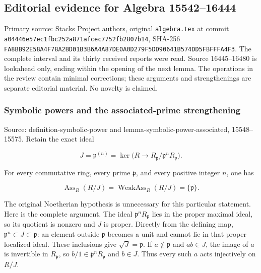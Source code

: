 \subsection{Editorial evidence for Algebra 15542--16444}\label{algebra-proof-005-editorial-evidence-for-algebra-1554216444}

Primary source: Stacks Project authors, original \texttt{algebra.tex} at commit \texttt{a044\allowbreak{}46e5\allowbreak{}7ec1\allowbreak{}fbc2\allowbreak{}52a8\allowbreak{}71af\allowbreak{}cec7\allowbreak{}752f\allowbreak{}b280\allowbreak{}7b14}, SHA-256 \texttt{FA8B\allowbreak{}B92E\allowbreak{}58A4\allowbreak{}F78A\allowbreak{}2BD0\allowbreak{}1B3B\allowbreak{}6A4A\allowbreak{}87DE\allowbreak{}0A0D\allowbreak{}279F\allowbreak{}5DD9\allowbreak{}0641\allowbreak{}B574\allowbreak{}DD5F\allowbreak{}BFFF\allowbreak{}A4F3}. The complete interval and its thirty received reports were read. Source 16445--16480 is lookahead only, ending within the opening of the next lemma. The operations in the review contain minimal corrections; these arguments and strengthenings are separate editorial material. No novelty is claimed.

\subsubsection{Symbolic powers and the associated-prime strengthening}\label{algebra-proof-005-symbolic-powers-and-the-associated-prime-strengthening}

Source: definition-symbolic-power and lemma-symbolic-power-associated, 15548--15575. Retain the exact ideal

\[
J=\mathfrak p^{(n)}=\ker\bigl(R\longrightarrow R_{\mathfrak p}/\mathfrak p^nR_{\mathfrak p}\bigr).
\]

For every commutative ring, every prime \(\mathfrak p\), and every positive integer \(n\), one has

\[
\operatorname{Ass}_R(R/J)=\operatorname{WeakAss}_R(R/J)=\{\mathfrak p\}.
\]

The original Noetherian hypothesis is unnecessary for this particular statement. Here is the complete argument. The ideal \(\mathfrak p^nR_{\mathfrak p}\) lies in the proper maximal ideal, so its quotient is nonzero and \(J\) is proper. Directly from the defining map, \(\mathfrak p^n\subset J\subset\mathfrak p\): an element outside \(\mathfrak p\) becomes a unit and cannot lie in that proper localized ideal. These inclusions give \(\sqrt J=\mathfrak p\). If \(a\notin\mathfrak p\) and \(ab\in J\), the image of \(a\) is invertible in \(R_{\mathfrak p}\), so \(b/1\in\mathfrak p^nR_{\mathfrak p}\) and \(b\in J\). Thus every such \(a\) acts injectively on \(R/J\).

